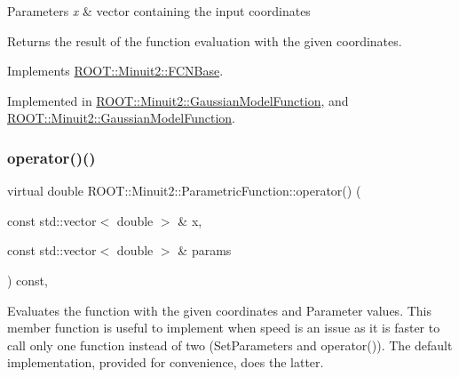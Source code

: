 \begin{DoxyParams}{Parameters}
{\em x} & vector containing the input coordinates\\
\hline
\end{DoxyParams}
\begin{DoxyReturn}{Returns}
the result of the function evaluation with the given coordinates. 
\end{DoxyReturn}


Implements \mbox{\hyperlink{classROOT_1_1Minuit2_1_1FCNBase_ae4a86bd94d0d0f5ca6fc8f8ab2bb43cd}{R\+O\+O\+T\+::\+Minuit2\+::\+F\+C\+N\+Base}}.



Implemented in \mbox{\hyperlink{classROOT_1_1Minuit2_1_1GaussianModelFunction_af4102c5eecd496d63c5592f7519248ce}{R\+O\+O\+T\+::\+Minuit2\+::\+Gaussian\+Model\+Function}}, and \mbox{\hyperlink{classROOT_1_1Minuit2_1_1GaussianModelFunction_af4102c5eecd496d63c5592f7519248ce}{R\+O\+O\+T\+::\+Minuit2\+::\+Gaussian\+Model\+Function}}.

\mbox{\label{classROOT_1_1Minuit2_1_1ParametricFunction_a5fab6e804e0f93bd593580f582b0f7c5}} 
\subsubsection{\texorpdfstring{operator()()}{operator()()}\hspace{0.1cm}{\footnotesize\ttfamily [4/6]}}
{\footnotesize\ttfamily virtual double R\+O\+O\+T\+::\+Minuit2\+::\+Parametric\+Function\+::operator() (\begin{DoxyParamCaption}\item[{const std\+::vector$<$ double $>$ \&}]{x,  }\item[{const std\+::vector$<$ double $>$ \&}]{params }\end{DoxyParamCaption}) const\hspace{0.3cm}{\ttfamily [inline]}, {\ttfamily [virtual]}}

Evaluates the function with the given coordinates and Parameter values. This member function is useful to implement when speed is an issue as it is faster to call only one function instead of two (Set\+Parameters and operator()). The default implementation, provided for convenience, does the latter.


